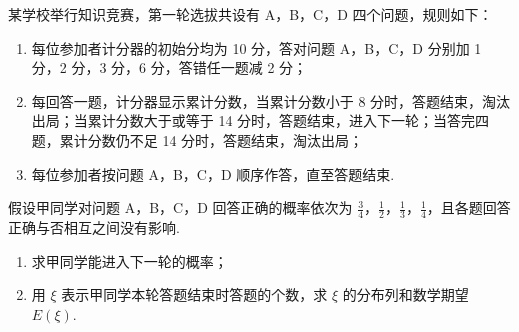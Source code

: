 \begin{problem}
某学校举行知识竞赛，第一轮选拔共设有 A，B，C，D 四个问题，规则如下：
\begin{enumerate}
\item 每位参加者计分器的初始分均为 10 分，答对问题 A，B，C，D 分别加 1 分，2 分，3 分，6 分，答错任一题减 2 分；
\item 每回答一题，计分器显示累计分数，当累计分数小于 8 分时，答题结束，淘汰出局；当累计分数大于或等于 14 分时，答题结束，进入下一轮；当答完四题，累计分数仍不足 14 分时，答题结束，淘汰出局；
\item 每位参加者按问题 A，B，C，D 顺序作答，直至答题结束.
\end{enumerate}
假设甲同学对问题 A，B，C，D 回答正确的概率依次为 \(\frac{3}{4}\)，\(\frac{1}{2}\)，\(\frac{1}{3}\)，\(\frac{1}{4}\)，且各题回答正确与否相互之间没有影响.
\begin{enumerate}
\item 求甲同学能进入下一轮的概率；
\item 用 \(\xi\) 表示甲同学本轮答题结束时答题的个数，求 \(\xi\) 的分布列和数学期望 \(E(\xi)\).
\end{enumerate}
\end{problem}


